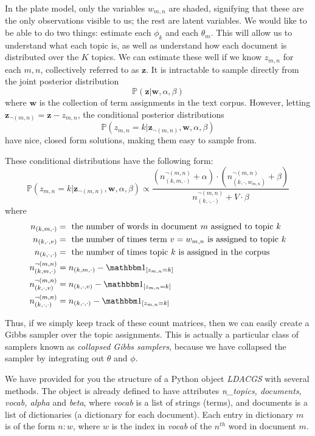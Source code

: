 In the plate model, only the variables $w_{m,n}$ are shaded, signifying that these are the only observations visible to us; the rest are latent variables. We would like to be able to do two things: estimate each $\phi_{k}$ and each $\theta_{m}$. This will allow us to understand what each topic is, as well as understand how each document is distributed over the $K$ topics. We can estimate these well if we know $z_{m,n}$ for each $m, n$, collectively referred to as $\mathbf{z}$. It is intractable to sample directly from the joint posterior distribution $$\mathbb{P}(\mathbf{z} | \mathbf{w}, \alpha, \beta)$$ where $\mathbf{w}$ is the collection of term assignments in the text corpus. However, letting $\mathbf{z}_{\neg (m,n)} = \mathbf{z} - z_{m,n}$, the conditional posterior distributions $$\mathbb{P}(z_{m,n} = k | \mathbf{z}_{\neg (m,n)}, \mathbf{w}, \alpha, \beta)$$ have nice, closed form solutions, making them easy to sample from.

These conditional distributions have the following form:
$$\mathbb{P}(z_{m,n} = k | \mathbf{z}_{\neg (m,n)}, \mathbf{w}, \alpha, \beta) \propto \frac{(n_{(k,m,\cdot)}^{\neg (m,n)} + \alpha)\cdot(n_{(k, \cdot, w_{m,n})}^{\neg (m,n)} + \beta)}{n_{(k,\cdot,\cdot)}^{\neg (m,n)} + V \cdot \beta}$$
where 
\begin{align*}
n_{(k,m,\cdot)} & = \mbox{ the number of words in document $m$ assigned to topic $k$} \\
n_{(k,\cdot,v)} & = \mbox{ the number of times term $v = w_{m,n}$ is assigned to topic $k$} \\
n_{(k,\cdot,\cdot)} & = \mbox{ the number of times topic $k$ is assigned in the corpus} \\
n_{(k,m,\cdot)}^{\neg (m,n)} & = n_{(k,m,\cdot)} - \indicator{z_{m,n} = k} \\
n_{(k,\cdot,v)}^{\neg (m,n)} & = n_{(k,\cdot,v)} - \indicator{z_{m,n} = k} \\
n_{(k,\cdot,\cdot)}^{\neg (m,n)} & = n_{(k,\cdot,\cdot)} - \indicator{z_{m,n} = k}
\end{align*}

Thus, if we simply keep track of these count matrices, then we can easily create a Gibbs sampler over the topic assignments. This is actually a particular class of samplers known as \emph{collapsed Gibbs samplers}, because we have collapsed the sampler by integrating out $\theta$ and $\phi$.

We have provided for you the structure of a Python object \emph{LDACGS} with several methods. The object is already defined to have attributes \emph{n\_topics, documents, vocab, alpha} and \emph{beta}, where \emph{vocab} is a list of strings (terms), and documents is a list of dictionaries (a dictionary for each document). Each entry in dictionary $m$ is of the form $n : w$, where $w$ is the index in \emph{vocab} of the $n^{th}$ word in document $m$.

